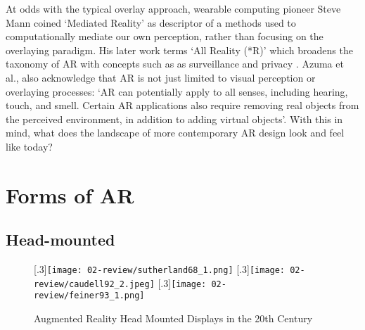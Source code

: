 At odds with the typical overlay approach, wearable computing pioneer Steve Mann coined `Mediated Reality' \citeyearpar{mann1994} as descriptor of a methods used to computationally mediate our own perception, rather than focusing on the overlaying paradigm. His later work terms `All Reality (*R)' which broadens the taxonomy of AR with concepts such as as surveillance and privacy \citeyearpar{mann2018}. Azuma et al., also acknowledge that AR is not just limited to visual perception or overlaying processes: `AR can potentially apply to all senses, including hearing, touch, and smell. Certain AR applications also require removing real objects from the perceived environment, in addition to adding virtual objects'. With this in mind, what does the landscape of more contemporary AR design look and feel like today?




\section{Forms of AR}\label{sec: ar-forms}
\subsection{Head-mounted}\label{sec: ar-forms-hmd}
\begin{figure}
    \centering
    \captionsetup{justification=centering}
    [.3\linewidth]{\texttt{[image: 02-review/sutherland68\_1.png]}}
    \hfill
    [.3\linewidth]{\texttt{[image: 02-review/caudell92\_2.jpeg]}}
    \hfill
    [.3\linewidth]{\texttt{[image: 02-review/feiner93\_1.png]}}%
    \caption{Augmented Reality Head Mounted Displays in the 20th Century}
    \label{fig: historicalHMDs}
\end{figure}

